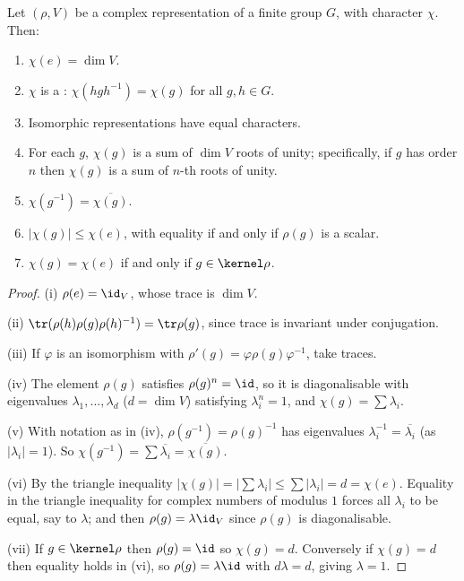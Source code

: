 \begin{proposition}
	Let $(\rho, V)$ be a complex representation of a finite group $G$, with character $\chi$. Then:
	\begin{enumerate}[label=(\roman*)]
		\item $\chi(e) = \dim V$.
		\item $\chi$ is a : $\chi(hgh^{-1}) = \chi(g)$ for all $g,h \in G$.
		\item Isomorphic representations have equal characters.
		\item For each $g$, $\chi(g)$ is a sum of $\dim V$ roots of unity; specifically, if $g$ has order $n$ then $\chi(g)$ is a sum of $n$-th roots of unity.
		\item $\chi(g^{-1}) = \overline{\chi(g)}$.
		\item $|\chi(g)| \leq \chi(e)$, with equality if and only if $\rho(g)$ is a scalar.
		\item $\chi(g) = \chi(e)$ if and only if $g \in \kernel\rho$.
	\end{enumerate}
\end{proposition}
\begin{proof}
	(i) $\rho(e) = \id_V$, whose trace is $\dim V$.

	(ii) $\tr(\rho(h)\rho(g)\rho(h)^{-1}) = \tr \rho(g)$, since trace is invariant under conjugation.

	(iii) If $\varphi$ is an isomorphism with $\rho'(g) = \varphi\rho(g)\varphi^{-1}$, take traces.

	(iv) The element $\rho(g)$ satisfies $\rho(g)^n = \id$, so it is diagonalisable with eigenvalues $\lambda_1, \dots, \lambda_d$ ($d = \dim V$) satisfying $\lambda_i^n = 1$, and $\chi(g) = \sum \lambda_i$.

	(v) With notation as in (iv), $\rho(g^{-1}) = \rho(g)^{-1}$ has eigenvalues $\lambda_i^{-1} = \overline{\lambda_i}$ (as $|\lambda_i| = 1$). So $\chi(g^{-1}) = \sum \overline{\lambda_i} = \overline{\chi(g)}$.

	(vi) By the triangle inequality $|\chi(g)| = |\sum\lambda_i| \leq \sum|\lambda_i| = d = \chi(e)$. Equality in the triangle inequality for complex numbers of modulus $1$ forces all $\lambda_i$ to be equal, say to $\lambda$; and then $\rho(g) = \lambda\id_V$ since $\rho(g)$ is diagonalisable.

	(vii) If $g \in \kernel\rho$ then $\rho(g) = \id$ so $\chi(g) = d$. Conversely if $\chi(g) = d$ then equality holds in (vi), so $\rho(g) = \lambda \id$ with $d\lambda = d$, giving $\lambda = 1$.
\end{proof}

